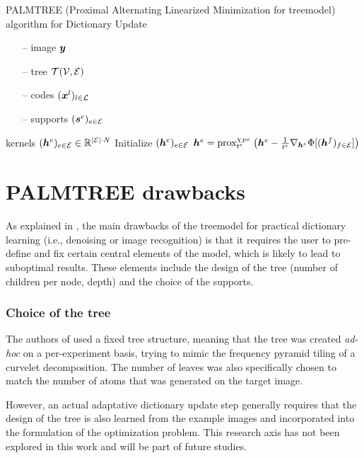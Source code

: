\begin{algorithm}[!ht]
    \caption{\ac{PALMTREE} (Proximal Alternating Linearized Minimization for \Gls{treemodel}) algorithm for Dictionary Update}\label{alg_palmtree}
  \begin{algorithmic}[1]
    \Input
    \begin{itemize}
    	\item[--] image $\bm{y}$
    	\item[--] tree $\mathcal T(\mathcal V,\mathcal E)$
    	\item[--] codes $(\bm{x}^l)_{l \in \mathcal L}$
    	\item[--] supports $(\bm{s}^e)_{e \in \mathcal E}$
    \end{itemize}
    \Output kernels $(\bm{h}^e)_{e \in \mathcal E} \in \mathbb{R}^{|\mathcal E| \cdot N}$
    \State Initialize $(\bm{h}^e)_{e \in \mathcal E}$
      	\State $\bm{h}^e = \text{prox}^{\chi_{{\mathcal D}^e}}_{t^e} \left(\bm{h}^e-\frac{1}{t^e} \nabla_{\bm{h}^e} \Phi[(\bm{h}^f)_{f \in \mathcal E}] \right)$
      \EndFor
    \EndWhile
  \end{algorithmic}
\end{algorithm}


\section{PALMTREE drawbacks}
As explained in \cite[p. 23]{chabiron_optimization_2016}, the main drawbacks of the \gls{treemodel} for practical dictionary learning (i.e., denoising or image recognition) is that it requires the user to pre-define and fix certain central elements of the model, which is likely to lead to suboptimal results. These elements include the design of the tree (number of children per node, depth) and the choice of the supports.
\subsubsection{Choice of the tree}
The authors of \cite{chabiron_optimization_2016} used a fixed tree structure, meaning that the tree was created \textit{ad-hoc} on a per-experiment basis, trying to mimic the frequency pyramid tiling of a curvelet decomposition. The number of leaves was also specifically chosen to match the number of atoms that was generated on the target image.

\noindent
However, an actual adaptative dictionary update step generally requires that the design of the tree is also learned from the example images and incorporated into the formulation of the optimization problem. This research axis has not been explored in this work and will be part of future studies.

